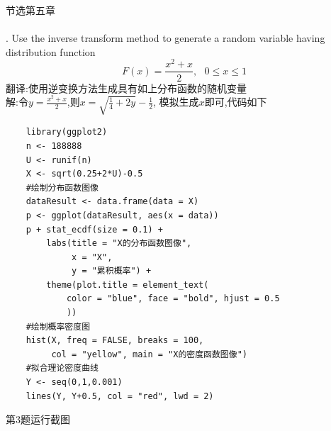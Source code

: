 \documentclass{book}
\begin{document}
\centering
节选第五章 \\

\hspace*{\fill} \\
\justifying
{}. Use the inverse transform method to generate a random variable having distribution function
$$
  F(x) = \frac{x^{2}+x}{2}, \ \ \  0\leq x\leq 1
$$
\noindent
翻译:使用逆变换方法生成具有如上分布函数的随机变量 \\
解:令$y=\frac{x^{2}+x}{2}$,则$x=\sqrt{\frac{1}{4}+2y}-\frac{1}{2}$, 模拟生成$x$即可,代码如下
\lstset{language = R}
\begin{lstlisting}
    library(ggplot2)
    n <- 188888
    U <- runif(n)
    X <- sqrt(0.25+2*U)-0.5
    #绘制分布函数图像
    dataResult <- data.frame(data = X)
    p <- ggplot(dataResult, aes(x = data)) 
    p + stat_ecdf(size = 0.1) + 
        labs(title = "X的分布函数图像",
             x = "X",
             y = "累积概率") + 
        theme(plot.title = element_text(
            color = "blue", face = "bold", hjust = 0.5
            ))
    #绘制概率密度图
    hist(X, freq = FALSE, breaks = 100, 
         col = "yellow", main = "X的密度函数图像")
    #拟合理论密度曲线
    Y <- seq(0,1,0.001)
    lines(Y, Y+0.5, col = "red", lwd = 2)
\end{lstlisting}
第3题运行截图
\begin{figure}[H]
\end{figure}
\end{document}
